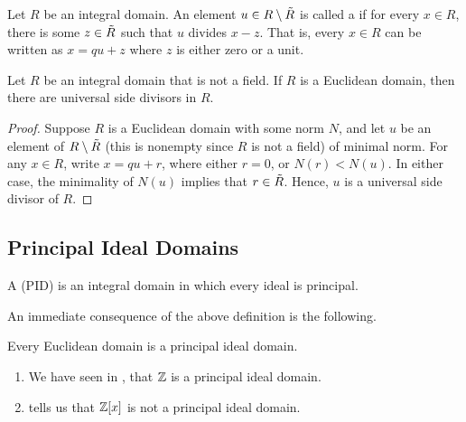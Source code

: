 \begin{defn}
    Let $R$ be an integral domain. An element $u \in R \setminus \Tilde{R}$ is called a  if for every $x \in R$, there is some $z \in \Tilde{R}$ such that $u$ divides $x - z$. That is, every $x \in R$ can be written as $x = qu + z$ where $z$ is either zero or a unit.
\end{defn}

\begin{prop}
    Let $R$ be an integral domain that is not a field. If $R$ is a Euclidean domain, then there are universal side divisors in $R$. 
\end{prop}
\begin{proof}
    Suppose $R$ is a Euclidean domain with some norm $N$, and let $u$ be an element of $R \setminus \Tilde{R}$ (this is nonempty since $R$ is not a field) of minimal norm. For any $x \in R$, write $x = qu + r$, where either $r = 0$, or $N(r) < N(u)$. In either case, the minimality of $N(u)$ implies that $r \in \Tilde{R}$. Hence, $u$ is a universal side divisor of $R$.
\end{proof}

\subsection{Principal Ideal Domains}

\begin{defn}
    A  (PID) is an integral domain in which every ideal is principal.
\end{defn}
An immediate consequence of the above definition is the following. 
\begin{cor} \label{cor:ED-is-PID}
    Every Euclidean domain is a principal ideal domain.
\end{cor}

\begin{ex}
\phantom{hi}
\begin{enumerate}
    \item We have seen in , that $\mathbb{Z}$ is a principal ideal domain.
    \item {} tells us that $\mathbb{Z}[x]$ is not a principal ideal domain.
\end{enumerate}
\end{ex}


